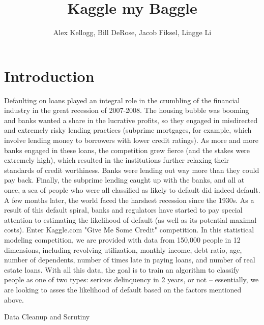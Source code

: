 \documentclass[11pt, oneside]{article}   	%
\title{Kaggle my Baggle}
\author{Alex Kellogg, Bill DeRose, Jacob Fiksel, Lingge Li}
\begin{document}
\maketitle
\section{Introduction}
	Defaulting on loans played an integral role in the crumbling of the financial industry in the great recession of 2007-2008. The housing bubble was booming and banks wanted a share in the lucrative profits, so they engaged in misdirected and extremely risky lending practices (subprime mortgages, for example, which involve lending money to borrowers with lower credit ratings). As more and more banks engaged in these loans, the competition grew fierce (and the stakes were extremely high), which resulted in the institutions further relaxing their standards of credit worthiness. Banks were lending out way more than they could pay back. Finally, the subprime lending caught up with the banks, and all at once, a sea of people who were all classified as likely to default did indeed default. A few months later, the world faced the harshest recession since the 1930s. As a result of this default spiral, banks and regulators have started to pay special attention to estimating the likelihood of default (as well as its potential maximal costs). 
Enter Kaggle.com "Give Me Some Credit" competition. In this statistical modeling competition, we are provided with data from 150,000 people in 12 dimensions, including revolving utilization, monthly income, debt ratio, age, number of dependents, number of times late in paying loans, and number of real estate loans. With all this data, the goal is to train an algorithm to classify people as one of two types: serious delinquency in 2 years, or not – essentially, we are looking to asses the likelihood of default based on the factors mentioned above.

Data Cleanup and Scrutiny
\end{document}

